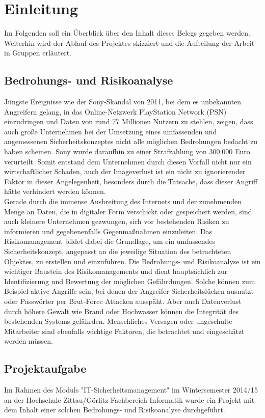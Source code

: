 \section{Einleitung}
Im Folgenden soll ein Überblick über den Inhalt dieses Belegs gegeben werden. Weiterhin wird der Ablauf des Projektes skizziert und die Aufteilung der Arbeit in Gruppen erläutert.

\subsection{Bedrohungs- und Risikoanalyse}
Jüngste Ereignisse wie der Sony-Skandal von 2011, bei dem es unbekannten Angreifern gelang, in das Online-Netzwerk PlayStation Network (PSN) einzudringen und Daten von rund 77 Millionen Nutzern zu stehlen, zeigen, dass auch große Unternehmen bei der Umsetzung eines umfassenden und angemessenen Sicherheitskonzeptes nicht alle möglichen Bedrohungen bedacht zu haben scheinen. Sony wurde daraufhin zu einer Strafzahlung von 300.000 Euro verurteilt. Somit entstand dem Unternehmen durch diesen Vorfall nicht nur ein wirtschaftlicher Schaden, auch der Imageverlust ist ein nicht zu ignorierender Faktor in dieser Angelegenheit, besonders durch die Tatsache, dass dieser Angriff hätte verhindert werden können. 
\\
Gerade durch die immense Ausbreitung des Internets und der zunehmenden Menge an Daten, die in digitaler Form verschickt oder gespeichert werden, sind auch kleinere Unternehmen gezwungen, sich vor bestehenden Risiken zu informieren und gegebenenfalls Gegenmaßnahmen einzuleiten. Das Risikomanagement bildet dabei die Grundlage, um ein umfassendes Sicherheitskonzept, angepasst an die jeweilige Situation des betrachteten Objektes, zu erstellen und einzuführen. Die Bedrohungs- und Risikoanalyse ist ein wichtiger Baustein des Risikomanagements und dient hauptsächlich zur Identifizierung und Bewertung der möglichen Gefährdungen. Solche können zum Beispiel aktive Angriffe sein, bei denen der Angreifer Sicherheitslücken ausnutzt oder Passwörter per Brut-Force Attacken ausspäht. Aber auch Datenverlust durch höhere Gewalt wie Brand oder Hochwasser können die Integrität des bestehenden Systems gefährden. Menschliches Versagen oder ungeschulte Mitarbeiter sind ebenfalls wichtige Faktoren, die betrachtet und eingeschätzt werden müssen.

\subsection{Projektaufgabe}
Im Rahmen des Moduls "IT-Sicherheitsmanagement" im Wintersemester 2014/15 an der Hochschule Zittau/Görlitz Fachbereich Informatik wurde ein Projekt mit dem Inhalt einer solchen Bedrohungs- und Risikoanalyse durchgeführt. 

